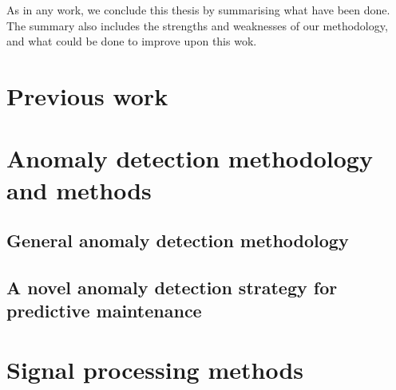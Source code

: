 \documentclass[11pt, oneside]{article}   	%
\begin{document}
As in any work, we conclude this thesis by summarising what have been done. The summary also includes the strengths and weaknesses of our methodology, and what could be done to improve upon this wok.



\section{Previous work}


\section{Anomaly detection methodology and methods}
\subsection{General anomaly detection methodology}
\subsection{A novel anomaly detection strategy for predictive maintenance}







\section{Signal processing methods}
\end{document}
